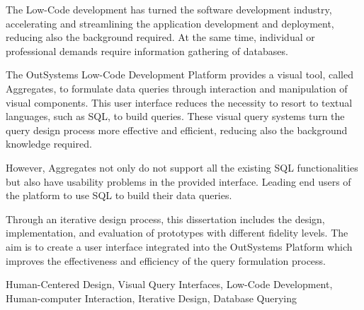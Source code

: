 The Low-Code development has turned the software development industry, accelerating and streamlining the application development and deployment, reducing also the background required. At the same time, individual or professional demands require information gathering of databases.

The OutSystems Low-Code Development Platform provides a visual tool, called Aggregates, to formulate data queries through interaction and manipulation of visual components. This user interface reduces the necessity to resort to textual languages, such as SQL, to build queries. These visual query systems turn the query design process more effective and efficient, reducing also the background knowledge required.

However, Aggregates not only do not support all the existing SQL functionalities but also have usability problems in the provided interface. Leading end users of the platform to use SQL to build their data queries.

Through an iterative design process, this dissertation includes the design, implementation, and evaluation of prototypes with different fidelity levels. The aim is to create a user interface integrated into the OutSystems Platform which improves the effectiveness and efficiency of the query formulation process.


\begin{keywords}
Human-Centered Design, Visual Query Interfaces, Low-Code Development, Human-computer Interaction, Iterative Design, Database Querying
\end{keywords} 
